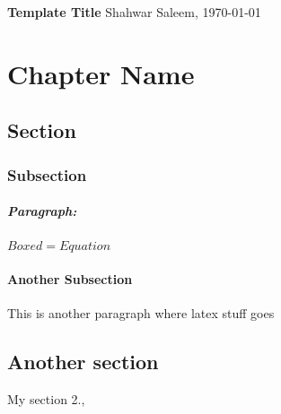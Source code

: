 \documentclass[
	paper=a4,%
	pagesize,%
	8pt, fleqn,%
	headings=small,%
	notitlepage,%
	parskip=never]%
	{scrreprt}
\newcommand{\mytitle}{Template Title}
\newcommand{\myauthor}{Shahwar Saleem}
\begin{document}
\begin{multicols*}{3}

{\bfseries\sffamily\LARGE\mytitle} \vspace{0.35em}  \hfill \myauthor, \today \vspace{0.5em}



\hfill

\chapter{Chapter Name}

\section{Section}

\subsection{Subsection}

\paragraph{Paragraph:} $\boxed{Boxed = Equation}$ 


\subsubsection{Another Subsection}
This is another paragraph where latex stuff goes

\section{Another section}

My section 2.,

\appendix


\nocite{*}
\printbibliography

\end{multicols*}
\end{document}
